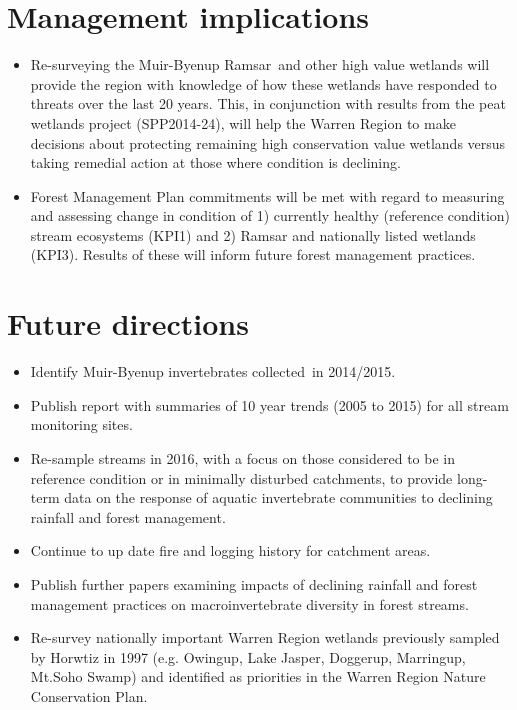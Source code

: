 \documentclass[version=last, 
    paper=a4, %
    10pt, %
    usenames,
    dvipsnames, 
    oneside, %
    headings=openany, %
    DIV=15 %
]{scrbook}
\begin{document}
\section*{Management implications}
\begin{itemize}
\itemsep1pt\parskip0pt
\item
  Re-surveying the Muir-Byenup Ramsar~and other high value wetlands will
  provide the region with knowledge of how these wetlands have responded
  to threats over the last 20 years. This, in conjunction with results
  from the peat wetlands project (SPP2014-24), will help the Warren
  Region to make decisions about protecting remaining high conservation
  value wetlands versus taking remedial action at those where condition
  is declining.
\item
  Forest Management Plan commitments will be met with regard to
  measuring and assessing change in condition of 1) currently healthy
  (reference condition) stream ecosystems (KPI1) and 2) Ramsar and
  nationally listed wetlands (KPI3). Results of these will inform future
  forest management practices.
\end{itemize}



\section*{Future directions}
\begin{itemize}
\itemsep1pt\parskip0pt
\item
  Identify Muir-Byenup invertebrates collected~in 2014/2015.
\item
  Publish report with summaries of 10 year trends (2005 to 2015) for all
  stream monitoring sites.
\item
  Re-sample streams in 2016, with a focus on those considered to be in
  reference condition or in minimally disturbed catchments, to provide
  long-term data on the response of aquatic invertebrate communities to
  declining rainfall and forest management.
\item
  Continue to up date fire and logging history for catchment areas.
\item
  Publish further papers examining impacts of declining rainfall and
  forest management practices on macroinvertebrate diversity in forest
  streams.
\item
  Re-survey nationally important Warren Region wetlands previously
  sampled by Horwtiz in 1997 (e.g. Owingup, Lake Jasper, Doggerup,
  Marringup, Mt.Soho Swamp) and identified as priorities in the Warren
  Region Nature Conservation Plan.
\end{itemize}



\end{document}
